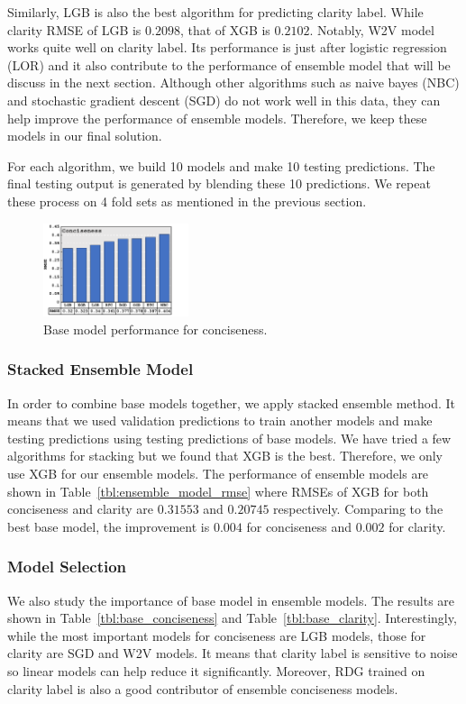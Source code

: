\documentclass[sigconf]{acmart}
\begin{document}
Similarly, LGB is also the best algorithm for predicting clarity label. While clarity RMSE of LGB is $0.2098$, that of XGB is $0.2102$. Notably, W2V model works quite well on clarity label. Its performance is just after logistic regression (LOR) and it also contribute to the performance of ensemble model that will be discuss in the next section. Although other algorithms such as naive bayes (NBC) and stochastic gradient descent (SGD) do not work well in this data, they can help improve the performance of ensemble models. Therefore, we keep these models in our final solution.

For each algorithm, we build 10 models and make 10 testing predictions. The final testing output is generated by blending these 10 predictions. We repeat these process on 4 fold sets as mentioned in the previous section.
\begin{figure}
  \centering
    \includegraphics[width=0.38\textwidth]{conciseness_base_model_rmse_new}
  \caption{Base model performance for conciseness.}
  \label{fig:con_base_model_rmse}
\end{figure}

\subsubsection{Stacked Ensemble Model}
In order to combine base models together, we apply stacked ensemble method. It means that we used validation predictions to train another models and make testing predictions using testing predictions of base models. We have tried a few algorithms for stacking but we found that XGB is the best. Therefore, we only use XGB for our ensemble models. The performance of ensemble models are shown in Table~\ref{tbl:ensemble_model_rmse} where RMSEs of XGB for both conciseness and clarity are $0.31553$ and $0.20745$ respectively. Comparing to the best base model, the improvement is $0.004$ for conciseness and $0.002$ for clarity.

\subsubsection{Model Selection}
We also study the importance of base model in ensemble models. The results are shown in Table~\ref{tbl:base_conciseness} and Table~\ref{tbl:base_clarity}. Interestingly, while the most important models for conciseness are LGB models, those for clarity are SGD and W2V models. It means that clarity label is sensitive to noise so linear models can help reduce it significantly. Moreover, RDG trained on clarity label is also a good contributor of ensemble conciseness models.
\end{document}
